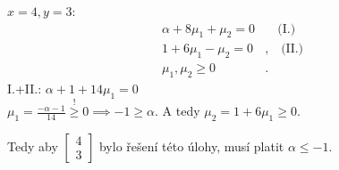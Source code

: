 $x=4, y=3$:
\begin{align*}
    \alpha + 8 \mu_1 + \mu_2 = 0& \quad \text{(I.)}\\
    1 + 6 \mu_1 - \mu_2 = 0&, \quad \text{(II.)}\\
    \mu_1, \mu_2 \geq 0&.
\end{align*}
I.+II.: $\alpha + 1 + 14 \mu_1 = 0$\\
$\mu_1 = \frac{-\alpha - 1}{14} \overset{!}{\geq} 0 \implies -1 \geq \alpha$. A tedy $\mu_2 = 1 + 6 \mu_1 \geq 0$.

Tedy aby
$\begin{bmatrix}
    4 \\
    3
\end{bmatrix}$ bylo řešení této úlohy, musí platit $\alpha \leq -1$.